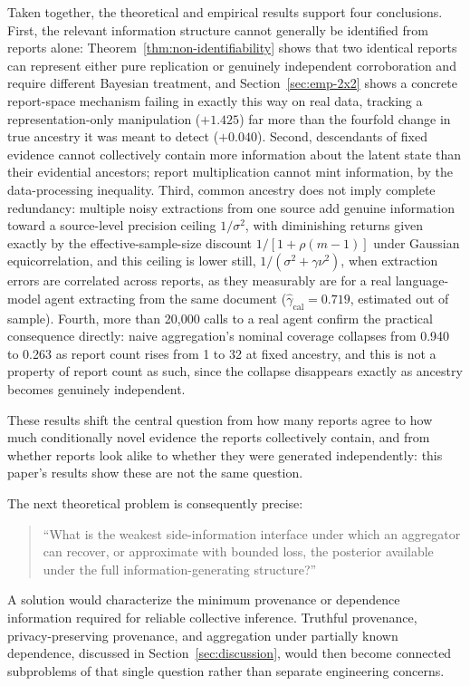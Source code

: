 \documentclass[11pt]{article}
\theoremstyle{definition}
\begin{document}
Taken together, the theoretical and empirical results support four conclusions. First, the relevant information structure cannot generally be identified from reports alone: Theorem~\ref{thm:non-identifiability} shows that two identical reports can represent either pure replication or genuinely independent corroboration and require different Bayesian treatment, and Section~\ref{sec:emp-2x2} shows a concrete report-space mechanism failing in exactly this way on real data, tracking a representation-only manipulation ($+1.425$) far more than the fourfold change in true ancestry it was meant to detect ($+0.040$). Second, descendants of fixed evidence cannot collectively contain more information about the latent state than their evidential ancestors; report multiplication cannot mint information, by the data-processing inequality. Third, common ancestry does not imply complete redundancy: multiple noisy extractions from one source add genuine information toward a source-level precision ceiling $1/\sigma^2$, with diminishing returns given exactly by the effective-sample-size discount $1/[1+\rho(m-1)]$ under Gaussian equicorrelation, and this ceiling is lower still, $1/(\sigma^2+\gamma\nu^2)$, when extraction errors are correlated across reports, as they measurably are for a real language-model agent extracting from the same document ($\hat\gamma_{\mathrm{cal}}=0.719$, estimated out of sample). Fourth, more than 20,000 calls to a real agent confirm the practical consequence directly: naive aggregation's nominal coverage collapses from 0.940 to 0.263 as report count rises from 1 to 32 at fixed ancestry, and this is not a property of report count as such, since the collapse disappears exactly as ancestry becomes genuinely independent.

These results shift the central question from how many reports agree to how much conditionally novel evidence the reports collectively contain, and from whether reports look alike to whether they were generated independently: this paper's results show these are not the same question.

The next theoretical problem is consequently precise:

\begin{quote}
``What is the weakest side-information interface under which an aggregator can recover, or approximate with bounded loss, the posterior available under the full information-generating structure?''
\end{quote}

A solution would characterize the minimum provenance or dependence information required for reliable collective inference. Truthful provenance, privacy-preserving provenance, and aggregation under partially known dependence, discussed in Section~\ref{sec:discussion}, would then become connected subproblems of that single question rather than separate engineering concerns.
\end{document}
